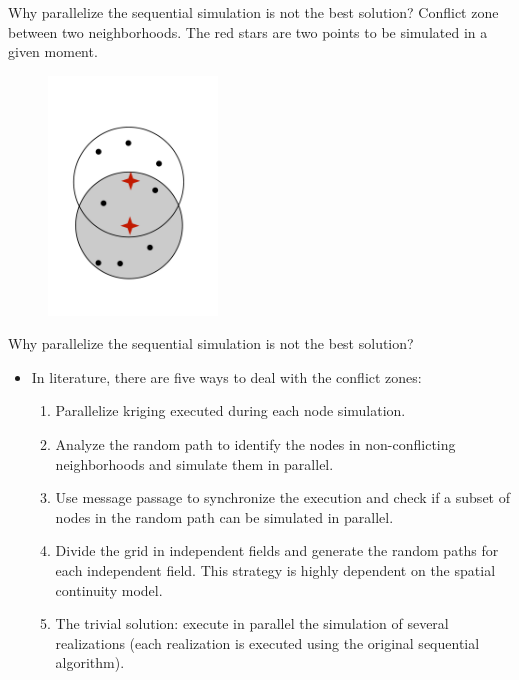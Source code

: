 \begin{frame}{Why parallelize the sequential simulation is not the best solution?}
Conflict zone between two neighborhoods. The red stars are two points to be simulated in a given moment.
\begin{figure}[h]
  \centering
    \includegraphics[width=0.4\textwidth,angle=90]{figs/conflict_zone.pdf}
    \label{conflict_zone}
\end{figure}

\end{frame}

\begin{frame}{Why parallelize the sequential simulation is not the best solution?}
	\begin{itemize}
    	\item In literature, there are five ways to deal with the conflict zones:
        \begin{enumerate}
        	\item Parallelize kriging executed during each node simulation. \cite{nunes2010parallelization}
            \item Analyze the random path to identify the nodes in non-conflicting neighborhoods and simulate them in parallel. \cite{vargas2007parallelization}
            \item Use message passage to synchronize the execution and check if a subset of nodes in the random path can be simulated in parallel. \cite{mariethoz2010general}
            \item Divide the grid in independent fields and generate the random paths for each independent field. This strategy is highly dependent on the spatial continuity model. \cite{rasera2015conflict}
            \item The trivial solution: execute in parallel the simulation of several realizations (each realization is executed using the original sequential algorithm).
        \end{enumerate}
    \end{itemize}
\end{frame}

